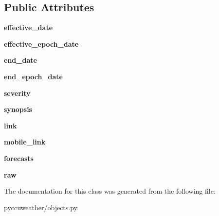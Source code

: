 \subsection*{Public Attributes}
\begin{DoxyCompactItemize}
\item 
\hypertarget{classpyccuweather_1_1objects_1_1_daily_forecasts_a09e2fe0933fba4e982258dfe890304d6}{}{\bfseries effective\+\_\+date}\label{classpyccuweather_1_1objects_1_1_daily_forecasts_a09e2fe0933fba4e982258dfe890304d6}

\item 
\hypertarget{classpyccuweather_1_1objects_1_1_daily_forecasts_aa031276990bf6f1d96c5e12d8e0ebf4d}{}{\bfseries effective\+\_\+epoch\+\_\+date}\label{classpyccuweather_1_1objects_1_1_daily_forecasts_aa031276990bf6f1d96c5e12d8e0ebf4d}

\item 
\hypertarget{classpyccuweather_1_1objects_1_1_daily_forecasts_aef969b946545dd22504b8f7034426ad8}{}{\bfseries end\+\_\+date}\label{classpyccuweather_1_1objects_1_1_daily_forecasts_aef969b946545dd22504b8f7034426ad8}

\item 
\hypertarget{classpyccuweather_1_1objects_1_1_daily_forecasts_aa1b15eaa58141994f4fe4937c066e130}{}{\bfseries end\+\_\+epoch\+\_\+date}\label{classpyccuweather_1_1objects_1_1_daily_forecasts_aa1b15eaa58141994f4fe4937c066e130}

\item 
\hypertarget{classpyccuweather_1_1objects_1_1_daily_forecasts_abaddf241e2251f918e8a9f04f6f0140c}{}{\bfseries severity}\label{classpyccuweather_1_1objects_1_1_daily_forecasts_abaddf241e2251f918e8a9f04f6f0140c}

\item 
\hypertarget{classpyccuweather_1_1objects_1_1_daily_forecasts_a52aef0531e08977cfd21923ef11f59f9}{}{\bfseries synopsis}\label{classpyccuweather_1_1objects_1_1_daily_forecasts_a52aef0531e08977cfd21923ef11f59f9}

\item 
\hypertarget{classpyccuweather_1_1objects_1_1_daily_forecasts_ad10804fd90a9d4d41e3f10f4a8781916}{}{\bfseries link}\label{classpyccuweather_1_1objects_1_1_daily_forecasts_ad10804fd90a9d4d41e3f10f4a8781916}

\item 
\hypertarget{classpyccuweather_1_1objects_1_1_daily_forecasts_a2534bd4513d41614840b4fbcb41bf67c}{}{\bfseries mobile\+\_\+link}\label{classpyccuweather_1_1objects_1_1_daily_forecasts_a2534bd4513d41614840b4fbcb41bf67c}

\item 
\hypertarget{classpyccuweather_1_1objects_1_1_daily_forecasts_a88957ab4a054c8080729a2df921fa159}{}{\bfseries forecasts}\label{classpyccuweather_1_1objects_1_1_daily_forecasts_a88957ab4a054c8080729a2df921fa159}

\item 
\hypertarget{classpyccuweather_1_1objects_1_1_daily_forecasts_aeee72fb67834c254e64f92f6f2a1ea8d}{}{\bfseries raw}\label{classpyccuweather_1_1objects_1_1_daily_forecasts_aeee72fb67834c254e64f92f6f2a1ea8d}

\end{DoxyCompactItemize}


The documentation for this class was generated from the following file\+:\begin{DoxyCompactItemize}
\item 
pyccuweather/objects.\+py\end{DoxyCompactItemize}
